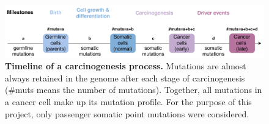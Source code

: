 \begin{figure}[ht!]
    \centering
    \includegraphics[scale=0.78]{graphics/drivers_demo.pdf}
    \caption{\textbf{Timeline of a carcinogenesis process.} Mutations are almost always retained in the genome after each stage of carcinogenesis (\#muts means the number of mutations). Together, all mutations in a cancer cell make up its mutation profile. For the purpose of this project, only passenger somatic point mutations were considered.}
    \label{fig:drivers_demo}
\end{figure}

